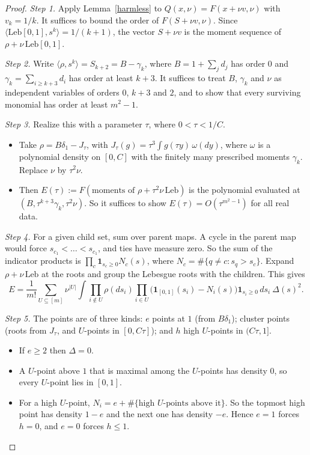 \documentclass[11pt]{article}
\theoremstyle{definition}
\theoremstyle{remark}
\begin{document}
\begin{proof}
\emph{Step 1.} Apply Lemma~\ref{harmless} to $Q(x,\nu)=F(x+\nu v,\nu)$ with $v_k=1/k$. It suffices to bound the
order of $F(S+\nu v,\nu)$. Since $\langle\mathrm{Leb}[0,1],s^k\rangle=1/(k+1)$, the vector $S+\nu v$ is the moment
sequence of $\rho+\nu\,\mathrm{Leb}[0,1]$.

\emph{Step 2.} Write $\langle\rho,s^k\rangle=S_{k+2}=B-\gamma_k$, where $B=1+\sum_jd_j$ has order $0$ and
$\gamma_k=\sum_{i\ge k+3}d_i$ has order at least $k+3$. It suffices to treat $B$, $\gamma_k$ and $\nu$ as
independent variables of orders $0$, $k+3$ and $2$, and to show that every surviving monomial has order at least
$m^2-1$.

\emph{Step 3.} Realize this with a parameter $\tau$, where $0<\tau<1/C$.
\begin{itemize}
\item Take $\rho=B\delta_1-J_\tau$, with $J_\tau(g)=\tau^3\int g(\tau y)\,\omega(dy)$, where $\omega$ is a
polynomial density on $[0,C]$ with the finitely many prescribed moments $\gamma_k$. Replace $\nu$ by $\tau^2\nu$.
\item Then $E(\tau):=F(\text{moments of }\rho+\tau^2\nu\,\mathrm{Leb})$ is the polynomial evaluated at
$(B,\tau^{k+3}\gamma_k,\tau^2\nu)$. So it suffices to show $E(\tau)=O(\tau^{m^2-1})$ for all real data.
\end{itemize}

\emph{Step 4.} For a given child set, sum over parent maps. A cycle in the parent map would force
$s_{c_1}<\dots<s_{c_1}$, and ties have measure zero. So the sum of the indicator products is
$\prod_c\mathbf 1_{s_c\ge0}N_c(s)$, where $N_c=\#\{q\ne c:s_q>s_c\}$. Expand $\rho+\nu\,\mathrm{Leb}$ at the roots
and group the Lebesgue roots with the children. This gives
\[
  E=\frac1{m!}\sum_{U\subseteq[m]}\nu^{|U|}\int\prod_{i\notin U}\rho(ds_i)\prod_{i\in U}
  \bigl(\mathbf 1_{[0,1]}(s_i)-N_i(s)\bigr)\mathbf 1_{s_i\ge0}\,ds_i\ \Delta(s)^2 .
\]

\emph{Step 5.} The points are of three kinds: $e$ points at $1$ (from $B\delta_1$); cluster points (roots from
$J_\tau$, and $U$-points in $[0,C\tau]$); and $h$ high $U$-points in $(C\tau,1]$.
\begin{itemize}
\item If $e\ge2$ then $\Delta=0$.
\item A $U$-point above $1$ that is maximal among the $U$-points has density $0$, so every $U$-point lies in
$[0,1]$.
\item For a high $U$-point, $N_i=e+\#\{\text{high }U\text{-points above it}\}$. So the topmost high point has
density $1-e$ and the next one has density $-e$. Hence $e=1$ forces $h=0$, and $e=0$ forces $h\le1$.
\end{itemize}


\end{proof}
\end{document}
